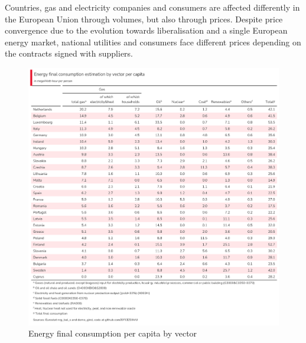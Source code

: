 \documentclass[
  9pt,
  a4paper,
  numbers=noendperiod,
  DIV=12]{scrartcl}
\begin{document}
Countries, gas and electricity companies and consumers are affected
differently in the European Union through volumes, but also through
prices. Despite price convergence due to the evolution towards
liberalisation and a single European energy market, national utilities
and consumers face different prices depending on the contracts signed
with suppliers.

\begin{figure}[htb]

\caption{\label{fig-nrg}Energy final consumption per capita by vector}

{\centering \includegraphics[width=1\textwidth,height=\textheight]{../svg/tab1.png}

}

\end{figure}
\end{document}
